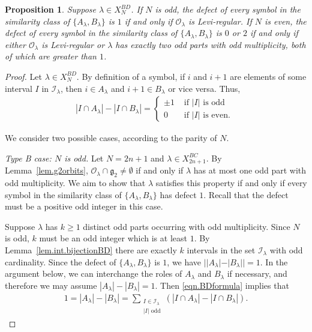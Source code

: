 \documentclass[reqno,11pt]{amsart}
\newtheorem{Prop}[Thm]{Proposition}
\theoremstyle{remark}
\theoremstyle{remark}
\theoremstyle{definition}
\theoremstyle{definition}
\theoremstyle{definition}
\numberwithin{equation}{section}
\newcommand{\fg}{{\mathfrak g}}
\newcommand{\ci}{\mathcal{I}}
\newcommand{\co}{\mathcal{O}}
\begin{document}
\begin{Prop}\label{typeBDdefect} Suppose $\lambda\in X_{N}^{BD}$.  If $N$ is odd, the defect of every symbol in the similarity class of $\{A_\lambda, B_\lambda\}$ is 
 $1$ if and only if $\co_\lambda$ is Levi-regular. If $N$ is even, the defect of every symbol in the similarity class of $\{A_\lambda, B_\lambda\}$ is $0$ or $2$ if and only if either $\co_\lambda$ is Levi-regular or $\lambda$ has exactly two odd parts with odd multiplicity, both of which are greater than $1$.   
\end{Prop}

\begin{proof}  Let $\lambda\in X_N^{BD}$. By definition of a symbol, if $i$ and $i+1$ are elements of some interval $I$ in $\ci_\lambda$, then $i\in A_\lambda$ and $i+1\in B_\lambda$ or vice versa. Thus, 
\begin{eqnarray}\label{eqn.BDformula}
|I\cap A_\lambda| - |I\cap B_\lambda| = \left\{ \begin{array}{ll} \pm 1 & \text{ if $|I|$ is odd} \\
0 & \text{ if $|I|$ is even. } \end{array}\right.
\end{eqnarray}

We consider two possible cases, according to the parity of $N$.

\medskip 

\textit{Type B case: $N$ is odd.}  Let $N = 2n+1$ and $\lambda\in X_{2n+1}^{BC}$.  By Lemma~\ref{lem.g2orbits}, $\co_\lambda\cap \fg_2\neq \emptyset$ if and only if $\lambda$ has at most one odd part with odd multiplicity.  We aim to show that $\lambda$ satisfies this property if and only if every symbol in the similarity class of $\{A_\lambda, B_\lambda \}$ has defect $1$. Recall that the defect must be a positive odd integer in this case.

Suppose $\lambda$ has $k\geq 1$ distinct odd parts occurring with odd multiplicity.  Since $N$ is odd, 
$k$ must be an odd integer which is at least $1$.  By Lemma~\ref{lem.int.bijectionBD} there are exactly $k$ intervals in the set $\ci_\lambda$ with odd cardinality.  
Since the defect of $\{A_\lambda, B_\lambda\}$ is $1$, we have $| |A_\lambda| - |B_\lambda| | = 1$.  In the argument below, we can interchange 
the roles of $A_\lambda$ and $B_\lambda$ if necessary, and therefore we may assume $ |A_\lambda| - |B_\lambda| = 1$.  Then \eqref{eqn.BDformula} implies that
\begin{eqnarray}\label{eqn.Bformula}
1 = |A_\lambda| - |B_\lambda| =  \sum_{\substack{I\in \ci_\lambda \\ |I| \text{ odd}}} \left( |I\cap A_\lambda| - |I\cap B_\lambda| \right).
\end{eqnarray}


\end{proof}
\end{document}
